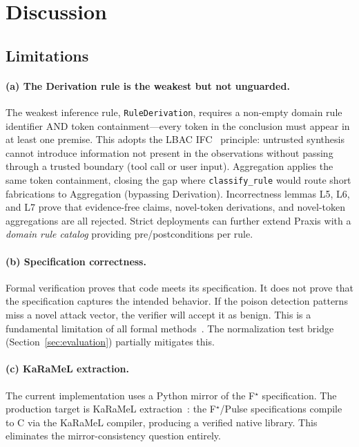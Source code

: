 \documentclass[sigplan,screen,nonacm]{acmart}
\newcommand{\fstar}{F\ensuremath{^\star}}
\begin{document}
\section{Discussion}
\label{sec:discussion}

\subsection{Limitations}

\paragraph{(a) The Derivation rule is the weakest but not unguarded.}
The weakest inference rule, \texttt{RuleDerivation}, requires a non-empty
domain rule identifier AND token containment---every token in the conclusion
must appear in at least one premise. This adopts the LBAC
IFC~\cite{zhou2026lbac} principle: untrusted synthesis cannot introduce
information not present in the observations without passing through a
trusted boundary (tool call or user input). Aggregation applies the same
token containment, closing the gap where \texttt{classify\_rule} would
route short fabrications to Aggregation (bypassing Derivation). Incorrectness
lemmas L5, L6, and L7 prove that evidence-free claims, novel-token
derivations, and novel-token aggregations are all rejected. Strict
deployments can further extend Praxis with a \emph{domain rule catalog}
providing pre/postconditions per rule.

\paragraph{(b) Specification correctness.}
Formal verification proves that code meets its specification. It does not
prove that the specification captures the intended behavior. If the poison
detection patterns miss a novel attack vector, the verifier will accept it
as benign. This is a fundamental limitation of all formal
methods~\cite{rand2026verified}. The normalization test bridge (Section~\ref{sec:evaluation})
partially mitigates this.

\paragraph{(c) KaRaMeL extraction.}
The current implementation uses a Python mirror of the \fstar{}
specification. The production target is KaRaMeL
extraction~\cite{protzenko2017verified}: the \fstar{}/Pulse specifications
compile to C via the KaRaMeL compiler, producing a verified native library.
This eliminates the mirror-consistency question entirely.
\end{document}
